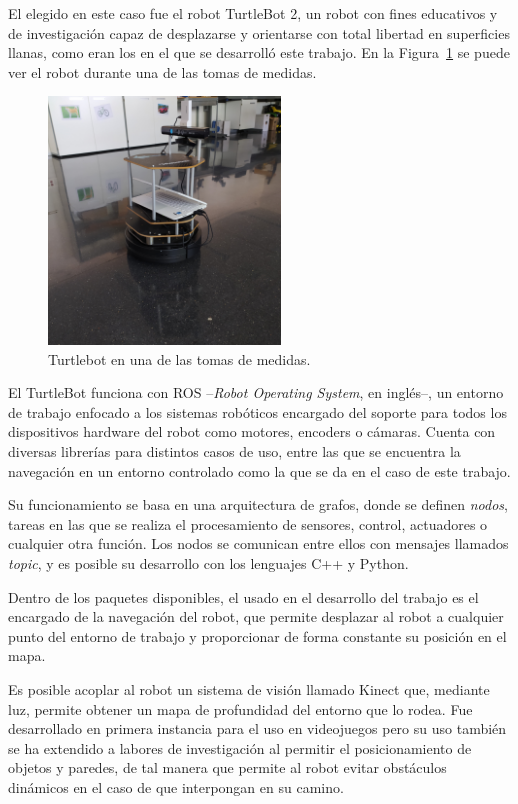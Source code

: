 El elegido en este caso fue el robot TurtleBot 2, un robot con fines educativos y de investigación capaz de desplazarse y orientarse con total libertad en superficies llanas, como eran los en el que se desarrolló este trabajo.
En la Figura~\ref{fig:robot} se puede ver el robot durante una de las tomas de medidas.

\begin{figure}[H]
    \centering
    \includegraphics[width=0.55\textwidth]{pic/robot_lab.jpg}
    \caption{Turtlebot en una de las tomas de medidas.}
    \label{fig:robot}
\end{figure}

El TurtleBot funciona con ROS --\textit{Robot Operating System}, en inglés--, un entorno de trabajo enfocado a los sistemas robóticos encargado del soporte para todos los dispositivos hardware del robot como motores, encoders o cámaras. 
Cuenta con diversas librerías para distintos casos de uso, entre las que se encuentra la navegación en un entorno controlado como la que se da en el caso de este trabajo.

Su funcionamiento se basa en una arquitectura de grafos, donde se definen \textit{nodos}, tareas en las que se realiza el procesamiento de sensores, control, actuadores o cualquier otra función.
Los nodos se comunican entre ellos con mensajes llamados \textit{topic}, y es posible su desarrollo con los lenguajes C++ y Python.

Dentro de los paquetes disponibles, el usado en el desarrollo del trabajo es el encargado de la navegación del robot, que permite desplazar al robot a cualquier punto del entorno de trabajo y proporcionar de forma constante su posición en el mapa.

Es posible acoplar al robot un sistema de visión llamado Kinect que, mediante luz, permite obtener un mapa de profundidad del entorno que lo rodea.
Fue desarrollado en primera instancia para el uso en videojuegos pero su uso también se ha extendido a labores de investigación al permitir el posicionamiento de objetos y paredes, de tal manera que permite al robot evitar obstáculos dinámicos en el caso de que interpongan en su camino.

